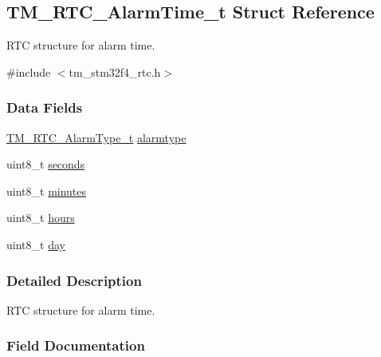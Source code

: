\hypertarget{struct_t_m___r_t_c___alarm_time__t}{}\subsection{T\+M\+\_\+\+R\+T\+C\+\_\+\+Alarm\+Time\+\_\+t Struct Reference}
\label{struct_t_m___r_t_c___alarm_time__t}


R\+T\+C structure for alarm time.  




{\ttfamily \#include $<$tm\+\_\+stm32f4\+\_\+rtc.\+h$>$}

\subsubsection*{Data Fields}
\begin{DoxyCompactItemize}
\item 
\hyperlink{group___t_m___r_t_c___typedefs_gaf7ce20d46cd105428f15c7f45b3b0882}{T\+M\+\_\+\+R\+T\+C\+\_\+\+Alarm\+Type\+\_\+t} \hyperlink{struct_t_m___r_t_c___alarm_time__t_a47319bdd7ad0d444587eaf62803a0335}{alarmtype}
\item 
uint8\+\_\+t \hyperlink{struct_t_m___r_t_c___alarm_time__t_a46729a903be1a03cdb248fb48d84d4f5}{seconds}
\item 
uint8\+\_\+t \hyperlink{struct_t_m___r_t_c___alarm_time__t_a7acca8be0094a19be6e308ac05924c4f}{minutes}
\item 
uint8\+\_\+t \hyperlink{struct_t_m___r_t_c___alarm_time__t_a00a531a34a1d603329df5778f1203ab6}{hours}
\item 
uint8\+\_\+t \hyperlink{struct_t_m___r_t_c___alarm_time__t_a72369a1087b2aeffe374bb054cb97c12}{day}
\end{DoxyCompactItemize}


\subsubsection{Detailed Description}
R\+T\+C structure for alarm time. 

\subsubsection{Field Documentation}
\hypertarget{struct_t_m___r_t_c___alarm_time__t_a47319bdd7ad0d444587eaf62803a0335}{}
